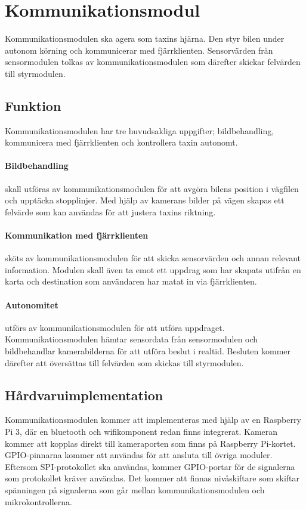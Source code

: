 \documentclass[designspec/spec.tex]{subfiles}
\begin{document}
\section{Kommunikationsmodul}
Kommunikationsmodulen ska agera som taxins hjärna. Den styr bilen under autonom
körning och kommunicerar med fjärrklienten. Sensorvärden från sensormodulen
tolkas av kommunikationsmodulen som därefter skickar felvärden till
styrmodulen.

\subsection{Funktion}
Kommunikationsmodulen har tre huvudsakliga uppgifter; bildbehandling,
kommunicera med fjärrklienten och kontrollera taxin autonomt.

\paragraph{Bildbehandling} skall utföras av kommunikationsmodulen för att
avgöra bilens position i vägfilen och upptäcka stopplinjer. Med hjälp av
kamerans bilder på vägen skapas ett felvärde som kan användas för att justera
taxins riktning.

\paragraph{Kommunikation med fjärrklienten} sköts av kommunikationsmodulen för
att skicka sensorvärden och annan relevant information. Modulen skall även ta
emot ett uppdrag som har skapats utifrån en karta och destination som
användaren har matat in via fjärrklienten.

\paragraph{Autonomitet} utförs av kommunikationsmodulen för att utföra
uppdraget. Kommunikationsmodulen hämtar sensordata från sensormodulen och
bildbehandlar kamerabilderna för att utföra beslut i realtid. Besluten kommer
därefter att översättas till felvärden som skickas till styrmodulen.

\subsection{Hårdvaruimplementation} 
Kommunikationsmodulen kommer att implementeras med hjälp av en Raspberry Pi 3,
där en bluetooth och wifikomponent redan finns integrerat. Kameran kommer att
kopplas direkt till kameraporten som finns på Raspberry Pi-kortet.
GPIO-pinnarna kommer att användas för att ansluta till övriga moduler.
Eftersom SPI-protokollet ska användas, kommer GPIO-portar för de
signalerna som protokollet kräver användas. Det kommer att finnas
nivåskiftare som skiftar spänningen på signalerna som går mellan
kommunikationsmodulen och mikrokontrollerna.
\end{document}
